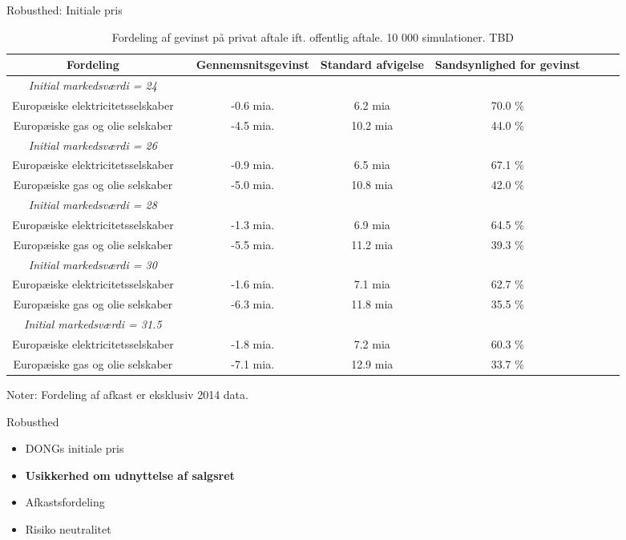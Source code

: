 \documentclass{beamer}
\newcommand\Fontvi{\fontsize{4}{7.2}\selectfont}
\begin{document}
\begin{frame}{Robusthed: Initiale pris}
\Fontvi
	\begin{table}[h]
	\caption{Fordeling af gevinst på privat aftale ift. offentlig aftale. 10 000 simulationer. TBD}
	\label{tab:rel_fordeling}
	\begin{tabularx}{\linewidth}{cXcccccr}
	\toprule[1pt]
	Fordeling && Gennemsnitsgevinst & Standard afvigelse & Sandsynlighed for gevinst\\
	\hline 
	\emph{Initial markedsværdi = 24} \\
		Europæiske elektricitetsselskaber && -0.6 mia. & 6.2 mia & 70.0  \% \\
	Europæiske gas og olie selskaber && -4.5 mia. & 10.2 mia & 44.0  \% \\
		\emph{Initial markedsværdi = 26} \\
		Europæiske elektricitetsselskaber && -0.9 mia. & 6.5 mia & 67.1  \% \\
	Europæiske gas og olie selskaber && -5.0 mia. & 10.8 mia & 42.0  \% \\
			\emph{Initial markedsværdi = 28} \\
		Europæiske elektricitetsselskaber && -1.3 mia. & 6.9 mia & 64.5  \% \\
	Europæiske gas og olie selskaber && -5.5 mia. & 11.2 mia & 39.3  \% \\
			\emph{Initial markedsværdi = 30} \\
		Europæiske elektricitetsselskaber && -1.6 mia. & 7.1 mia & 62.7  \% \\
	Europæiske gas og olie selskaber && -6.3 mia. & 11.8 mia & 35.5  \% \\
				\emph{Initial markedsværdi = 31.5} \\
		Europæiske elektricitetsselskaber && -1.8 mia. & 7.2 mia & 60.3  \% \\
	Europæiske gas og olie selskaber && -7.1 mia. & 12.9 mia & 33.7  \% \\

		\bottomrule[1pt]
	\end{tabularx}
	\begin{minipage}{\linewidth}
		\footnotesize{Noter: Fordeling af afkast er eksklusiv 2014 data.}
	\end{minipage}
\end{table}
\end{frame}

\begin{frame}{Robusthed}

\begin{itemize}
	\item DONGs initiale pris
	\item \textbf{Usikkerhed om udnyttelse af salgsret}
	\item Afkastsfordeling
	\item Risiko neutralitet
\end{itemize}

\end{frame}
\end{document}
